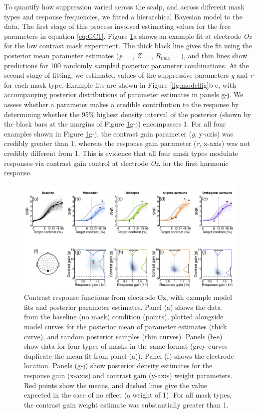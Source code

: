 \documentclass[]{article}
\begin{document}
To quantify how suppression varied across the scalp, and across different mask types and response frequencies, we fitted a hierarchical Bayesian model to the data. The first stage of this process involved estimating values for the free parameters in equation \eqref{eq:GC1}. Figure \ref{fig:modelfig1}a shows an example fit at electrode \emph{Oz} for the low contrast mask experiment. The thick black line gives the fit using the posterior mean parameter estimates (\emph{p} = , \emph{Z} = , \(R_{max}\) = ), and thin lines show predictions for 100 randomly sampled posterior parameter combinations. At the second stage of fitting, we estimated values of the suppressive parameters \emph{g} and \emph{r} for each mask type. Example fits are shown in Figure \ref{fig:modelfig}b-e, with accompanying posterior distributions of parameter estimates in panels g-j. We assess whether a parameter makes a credible contribution to the response by determining whether the 95\% highest density interval of the posterior (shown by the black bars at the margins of Figure \ref{fig:modelfig1}g-j) encompasses 1. For all four examples shown in Figure \ref{fig:modelfig1}g-j, the contrast gain parameter (\emph{g}, y-axis) was credibly greater than 1, whereas the response gain parameter (\emph{r}, x-axis) was not credibly different from 1. This is evidence that all four mask types modulate responses via contrast gain control at electrode \emph{Oz}, for the first harmonic response.

\begin{figure}

{\centering \includegraphics{figures/modelfig1} 

}

\caption{Contrast response functions from electrode Oz, with example model fits and posterior parameter estimates. Panel (a) shows the data from the baseline (no mask) condition (points), plotted alongside model curves for the posterior mean of parameter estimates (thick curve), and random posterior samples (thin curves). Panels (b-e) show data for four types of masks in the same format (grey curves duplicate the mean fit from panel (a)). Panel (f) shows the electrode location. Panels (g-j) show posterior density estimates for the response gain (x-axis) and contrast gain (y-axis) weight parameters. Red points show the means, and dashed lines give the value expected in the case of no effect (a weight of 1). For all mask types, the contrast gain weight estimate was substantially greater than 1.}\label{fig:modelfig1}
\end{figure}
\end{document}
